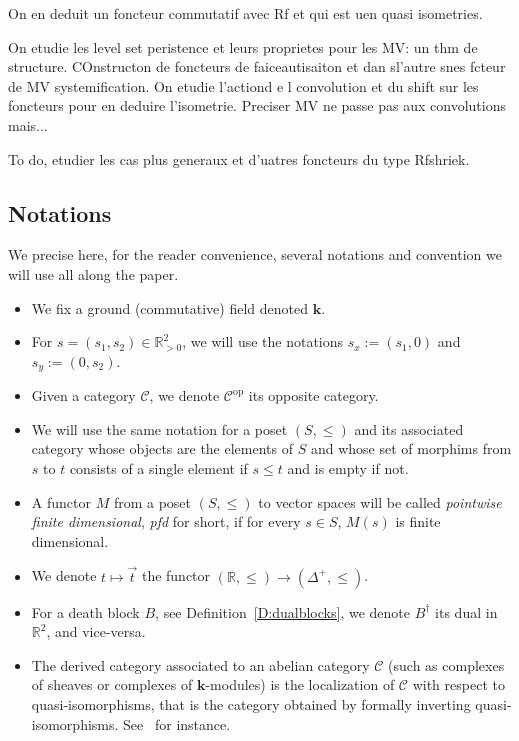 \documentclass[a4paper, english, 11pt]{article}
\newcommand{\kk}[0]{\textbf{k}}
\newcommand{\0}{\vec{0}}
\newcommand{\R}[0]{\mathbb{R}}
\newcommand{\C}[0]{\mathcal{C}}
\newcommand{\op}[0]{\text{op}}
\begin{document}
On en deduit un foncteur commutatif avec Rf et qui est uen quasi isometries.

On etudie les level set peristence et leurs proprietes pour les MV: un thm de structure. COnstructon de foncteurs de faiceautisaiton et dan sl'autre snes fcteur de MV systemification. On etudie l'actiond e l convolution et du shift sur les foncteurs pour en deduire l'isometrie. Preciser MV ne passe pas aux convolutions mais...

To do, etudier les cas plus generaux et d'uatres foncteurs du type Rfshriek.
\subsection{Notations}
We precise here, for the reader convenience, several notations and convention we will use all along the paper.
\begin{itemize}
\item We fix a ground (commutative) field denoted $\kk$.
    \item For $s=(s_1,s_2)\in \R^2_{>0}$, we will use the notations $s_x:=(s_1,0)$ and $s_y := (0,s_2)$.
    \item Given a category $\C$, we denote $\C^{\op}$ its opposite category. 
    \item We will use the same notation for a poset $(S, \leq)$ and its associated  category whose objects are the elements of $S$ and whose set of morphims from  $s$ to $t$ consists of a single element if $s\leq t$ and is empty if not.
    \item A functor $M$ from a poset $(S, \leq)$ to vector spaces will be called \emph{pointwise finite dimensional}, \emph{pfd} for short, if for every $s\in S$, $M(s)$ is finite dimensional. 
    \item We denote $t\mapsto \vec{t}$ the functor $(\R ,\leq) \to (\Delta^+, \leq)$.
    \item For a death block $B$, see Definition~\ref{D:dualblocks}, we denote $B^\dag$ its dual  in $\R^2$, and vice-versa.
    \item The derived category associated to an abelian category $\mathcal{C}$ (such as complexes of sheaves or complexes of $\kk$-modules) is the localization of $\mathcal{C}$ with respect to quasi-isomorphisms, that is the category obtained by formally inverting quasi-isomorphisms. See~\cite{Kash90, Grothendieck} for instance.
\end{itemize}
\end{document}
